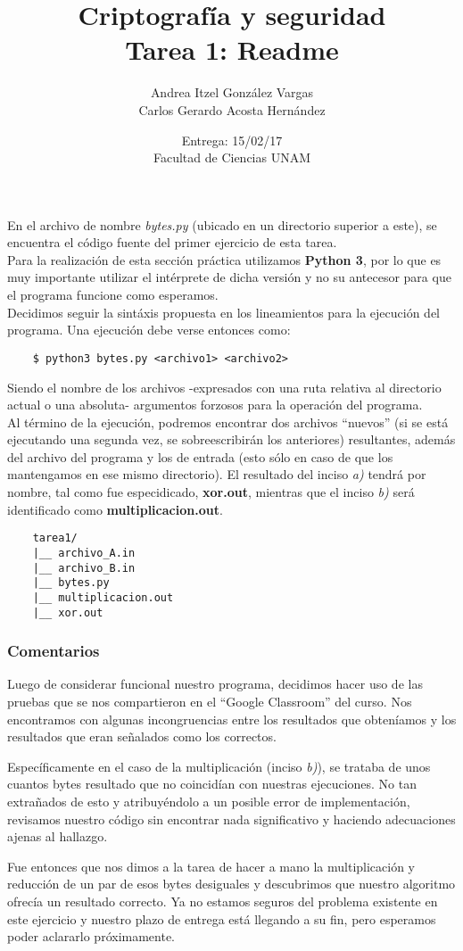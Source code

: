 \documentclass[12pt]{article}
\title{Criptografía y seguridad \\ Tarea 1: Readme}
\author{Andrea Itzel González Vargas \\ Carlos Gerardo Acosta Hernández}
\date{Entrega: 15/02/17 \\ Facultad de Ciencias UNAM}
\begin{document}
\maketitle
En el archivo de nombre \textit{bytes.py} (ubicado en un directorio superior a este), se encuentra el código fuente del primer ejercicio de esta tarea.\\

Para la realización de esta sección práctica utilizamos \textbf{Python 3}, por lo que es muy importante utilizar el intérprete de dicha versión y no su antecesor para que el programa funcione como esperamos.\\

Decidimos seguir la sintáxis propuesta en los lineamientos para la ejecución del programa. Una ejecución debe verse entonces como:
\begin{verbatim}
    $ python3 bytes.py <archivo1> <archivo2>
\end{verbatim}
Siendo el nombre de los archivos -expresados con una ruta relativa al directorio actual o una absoluta- argumentos forzosos para la operación
del programa.\\

Al término de la ejecución, podremos encontrar dos archivos ``nuevos'' (si se está ejecutando una segunda vez, se sobreescribirán los anteriores) resultantes, además del archivo del programa y los de entrada (esto sólo en caso de que los mantengamos en ese mismo directorio). El resultado del inciso \textit{a)} tendrá por nombre, tal como fue especidicado, \textbf{xor.out}, mientras que el inciso \textit{b)} será identificado como \textbf{multiplicacion.out}.

\begin{verbatim}
    tarea1/
    |__ archivo_A.in
    |__ archivo_B.in
    |__ bytes.py
    |__ multiplicacion.out
    |__ xor.out

\end{verbatim}
\newpage

\subsubsection*{Comentarios}
Luego de considerar funcional nuestro programa, decidimos hacer uso de las pruebas que se nos compartieron en el ``Google Classroom'' del curso.
Nos encontramos con algunas incongruencias entre los resultados que obteníamos y los resultados que eran señalados como los correctos.

Específicamente en el caso de la multiplicación (inciso \textit{b)}), 
se trataba de unos cuantos bytes resultado que no coincidían con nuestras ejecuciones. No tan extrañados de esto y atribuyéndolo a un posible error de implementación, revisamos nuestro código sin encontrar nada significativo y haciendo adecuaciones ajenas al hallazgo.

Fue entonces que nos dimos a la tarea de hacer a mano la multiplicación y reducción de un par de esos bytes desiguales y descubrimos que nuestro algoritmo ofrecía un resultado correcto. Ya no estamos seguros del problema existente en este ejercicio y nuestro plazo de entrega está llegando a su fin, pero esperamos poder aclararlo próximamente. 
\end{document}
